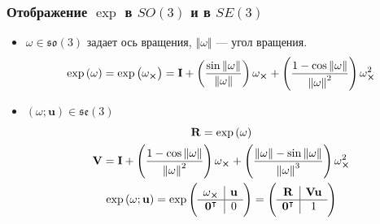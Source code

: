 \documentclass[notheorems,aspectratio=169]{beamer}
\begin{document}
\begin{frame}
  \frametitle{Отображение $\exp$ в $SO(3)$ и в $SE(3)$}
  \begin{itemize}
    \item $\omega\in \mathfrak{so}(3)$ задает ось вращения, $\left\Vert\omega\right\Vert$ --- угол вращения.
    \begin{equation*}
      \exp\left(\omega\right)=\exp\left(\omega_{\cross}\right)=\mathbf{I}+\left(\frac{\sin\left\Vert\omega\right\Vert}{\left\Vert\omega\right\Vert}\right)\omega_{\cross}+\left(\frac{1-\cos\left\Vert\omega\right\Vert}{\left\Vert\omega\right\Vert^2}\right)\omega_{\cross}^2
    \end{equation*}

  \item $\left(\omega; \mathbf{u}\right)\in \mathfrak{se}(3)$
    \begin{equation*}
    \begin{gathered}
      \mathbf{R}=\exp\left(\omega\right) \\
      \mathbf{V}=\mathbf{I}+\left(\frac{1-\cos\left\Vert\omega\right\Vert}{\left\Vert\omega\right\Vert^2}\right)\omega_{\cross}+\left(\frac{\left\Vert\omega\right\Vert-\sin\left\Vert\omega\right\Vert}{\left\Vert\omega\right\Vert^3}\right)\omega_{\cross}^2 \\
      \exp\left(\omega; \mathbf{u}\right)=\exp
      \begin{pmatrix}
        \begin{array}{c|c}
          \omega_{\cross} & \mathbf{u} \\
          \hline
          \mathbf{0}^\intercal & 0
        \end{array}
      \end{pmatrix} =
      \begin{pmatrix}
        \begin{array}{c|c}
          \mathbf{R} & \mathbf{V}\mathbf{u} \\
          \hline
          \mathbf{0}^\intercal & 1
        \end{array}
      \end{pmatrix}
    \end{gathered}
    \end{equation*}
  \end{itemize}
\end{frame}
\end{document}

